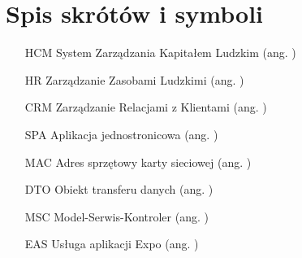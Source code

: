 \chapter{Spis skrótów i symboli}

\begin{itemize}
    \item[HCM] System Zarządzania Kapitałem Ludzkim (ang. )
    \item[HR] Zarządzanie Zasobami Ludzkimi (ang. )
    \item[CRM] Zarządzanie Relacjami z Klientami (ang. )
    \item[SPA] Aplikacja jednostronicowa (ang. )
    \item[MAC] Adres sprzętowy karty sieciowej (ang. )
    \item[DTO] Obiekt transferu danych (ang. )
    \item[MSC] Model-Serwis-Kontroler (ang. )
    \item[EAS] Usługa aplikacji Expo (ang. )
\end{itemize}
